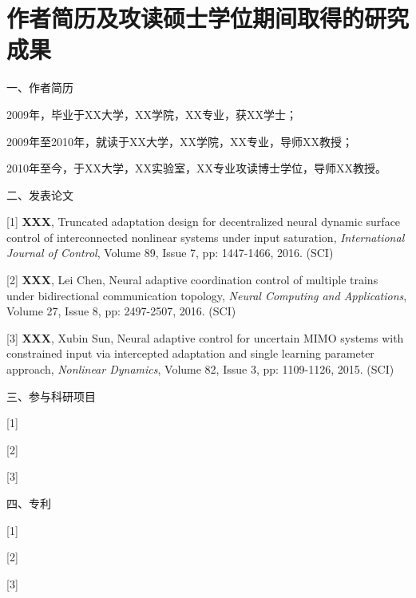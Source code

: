  \setlength{\baselineskip}{16pt}
\chapter{作者简历及攻读硕士学位期间取得的研究成果}
\setlength{\parindent}{0pt}


一、作者简历

2009年，毕业于XX大学，XX学院，XX专业，获XX学士；

2009年至2010年，就读于XX大学，XX学院，XX专业，导师XX教授；

2010年至今，于XX大学，XX实验室，XX专业攻读博士学位，导师XX教授。

\vspace{10pt}
二、发表论文

[1] \textbf{XXX}, Truncated adaptation design for decentralized neural dynamic surface control of interconnected nonlinear systems under input saturation, \emph{International Journal of Control}, Volume 89, Issue 7, pp: 1447-1466, 2016. (SCI)\vspace{-5pt}

[2] \textbf{XXX}, Lei Chen, Neural adaptive coordination control of multiple trains under bidirectional communication topology, \emph{Neural Computing and Applications}, Volume 27, Issue 8, pp: 2497-2507, 2016. (SCI)

[3] \textbf{XXX}, Xubin Sun, Neural adaptive control for uncertain MIMO systems with constrained input via intercepted adaptation and single learning parameter approach, \emph{Nonlinear Dynamics}, Volume 82, Issue 3, pp: 1109-1126, 2015. (SCI)


\vspace{10pt}
三、参与科研项目

[1]

[2]

[3]

\vspace{10pt}
四、专利

[1]

[2]

[3]


%
%
%
%
%    
%

